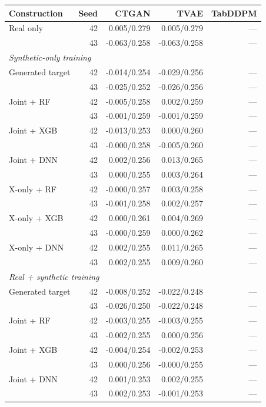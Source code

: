 \begin{table}[ht]
\centering
{\small
\setlength{\tabcolsep}{2pt}
\begin{tabular}{lrrrr}
\toprule
Construction & Seed & CTGAN & TVAE & TabDDPM \\
\midrule
Real only & 42 & 0.005/0.279 & 0.005/0.279 & --- \\
 & 43 & -0.063/0.258 & -0.063/0.258 & --- \\
\midrule
\multicolumn{5}{l}{\textit{Synthetic-only training}} \\
Generated target & 42 & -0.014/0.254 & -0.029/0.256 & --- \\
 & 43 & -0.025/0.252 & -0.026/0.256 & --- \\
Joint + RF & 42 & -0.005/0.258 & 0.002/0.259 & --- \\
 & 43 & -0.001/0.259 & -0.001/0.259 & --- \\
Joint + XGB & 42 & -0.013/0.253 & 0.000/0.260 & --- \\
 & 43 & -0.000/0.258 & -0.005/0.260 & --- \\
Joint + DNN & 42 & 0.002/0.256 & 0.013/0.265 & --- \\
 & 43 & 0.000/0.255 & 0.003/0.264 & --- \\
X-only + RF & 42 & -0.000/0.257 & 0.003/0.258 & --- \\
 & 43 & -0.001/0.258 & 0.002/0.257 & --- \\
X-only + XGB & 42 & 0.000/0.261 & 0.004/0.269 & --- \\
 & 43 & -0.000/0.259 & 0.000/0.262 & --- \\
X-only + DNN & 42 & 0.002/0.255 & 0.011/0.265 & --- \\
 & 43 & 0.002/0.255 & 0.009/0.260 & --- \\
\midrule
\multicolumn{5}{l}{\textit{Real + synthetic training}} \\
Generated target & 42 & -0.008/0.252 & -0.022/0.248 & --- \\
 & 43 & -0.026/0.250 & -0.022/0.248 & --- \\
Joint + RF & 42 & -0.003/0.255 & -0.003/0.255 & --- \\
 & 43 & -0.002/0.255 & 0.000/0.256 & --- \\
Joint + XGB & 42 & -0.004/0.254 & -0.002/0.253 & --- \\
 & 43 & 0.000/0.256 & -0.000/0.255 & --- \\
Joint + DNN & 42 & 0.001/0.253 & 0.002/0.255 & --- \\
 & 43 & 0.002/0.253 & -0.001/0.253 & --- \\

\end{tabular}}
\end{table}
